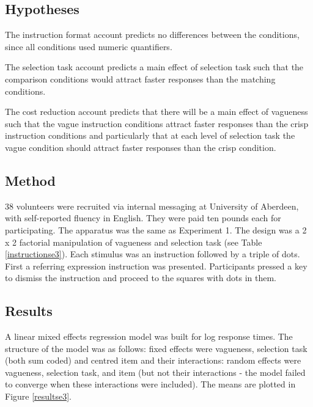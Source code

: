 \documentclass[
a4paper 
, doc
, longtable
]{apa6}
\begin{document}
\subsection{Hypotheses}

The instruction format account predicts no differences between the conditions, since all conditions used numeric quantifiers.

The selection task account predicts a main effect of selection task such that the comparison conditions would attract faster responses than the matching conditions.

The cost reduction account predicts that there will be a main effect of vagueness such that the vague instruction conditions attract faster responses than the crisp instruction conditions and particularly that at each level of selection task the vague condition should attract faster responses than the crisp condition.


\subsection{Method}

38 volunteers were recruited via internal messaging at University of Aberdeen, with self-reported fluency in English. They were paid ten pounds each for participating.
The apparatus was the same as Experiment 1.
The design was a 2 x 2 factorial manipulation of vagueness and selection task (see Table \ref{instructionse3}).
Each stimulus was an instruction followed by a triple of dots.
First a referring expression instruction was presented. Participants pressed a key to dismiss the instruction and proceed to the squares with dots in them.

\subsection{Results}
A linear mixed effects regression model was built for log response times. The structure of the model was as follows: fixed effects were vagueness, selection task (both sum coded) and centred item and their interactions: random effects were vagueness, selection task, and item (but not their interactions - the model failed to converge when these interactions were included). The means are plotted in Figure \ref{resultse3}.
\end{document}
